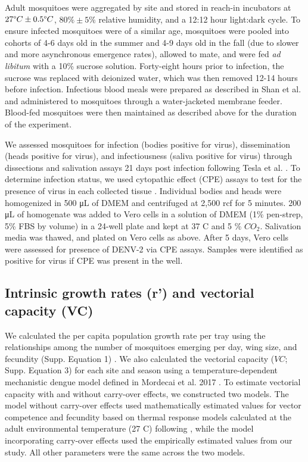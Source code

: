 \documentclass[12pt]{article}
\begin{document}
Adult mosquitoes were aggregated by site and stored in reach-in incubators at $27 \degree C \pm 0.5 \degree C$, $80\% \pm 5\%$ relative humidity, and a 12:12 hour light:dark cycle. To ensure infected mosquitoes were of a similar age, mosquitoes were pooled into cohorts of 4-6 days old in the summer and 4-9 days old in the fall (due to slower and more asynchronous emergence rates), allowed to mate, and were fed \textit{ad libitum} with a 10\% sucrose solution. Forty-eight hours prior to infection, the sucrose was replaced with deionized water, which was then removed 12-14 hours before infection. Infectious blood meals were prepared as described in Shan et al. \citep{shan2016} and administered to mosquitoes through a water-jacketed membrane feeder. Blood-fed mosquitoes were then maintained as described above for the duration of the experiment.

We assessed mosquitoes for infection (bodies positive for virus), dissemination (heads positive for virus), and infectiousness (saliva positive for virus) through dissections and salivation assays 21 days post infection following Tesla et al. \citep{tesla2017}. To determine infection status, we used cytopathic effect (CPE) assays to test for the presence of virus in each collected tissue \citep{balaya1969}. Individual bodies and heads were homogenized in 500 \si{\micro\liter} of DMEM and centrifuged at 2,500 rcf for 5 minutes. 200 \si{\micro\liter} of homogenate was added to Vero cells in a solution of DMEM (1\% pen-strep, 5\% FBS by volume) in a 24-well plate and kept at 37 \degree C and 5 \% ${CO_2}$. Salivation media was thawed, and plated on Vero cells as above. After 5 days, Vero cells were assessed for presence of DENV-2 via CPE assays. Samples were identified as positive for virus if CPE was present in the well.

\subsection{Intrinsic growth rates (r') and vectorial capacity (VC)}

We calculated the per capita population growth rate per tray using the  relationships among the number of mosquitoes emerging per day, wing size, and fecundity (Supp. Equation 1) \citep{livdahl1984}. We also calculated the vectorial capacity ($VC$; Supp. Equation 3) for each site and season using a temperature-dependent mechanistic dengue model defined in Mordecai et al. 2017 \citep{mordecai2017}. To estimate vectorial capacity with and without carry-over effects, we constructed two models. The model without carry-over effects used mathematically estimated values for vector competence and fecundity based on thermal response models calculated at the adult environmental temperature (27 \degree C) following \citep{mordecai2017}, while the model incorporating carry-over effects used the empirically estimated values from our study. All other parameters were the same across the two models.
\end{document}
